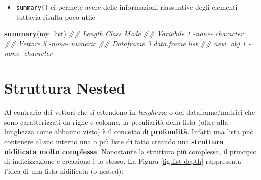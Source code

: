 \documentclass[
]{book}
\newenvironment{Shaded}{\begin{snugshade}}{\end{snugshade}}
\newcommand{\CommentTok}[1]{\textcolor[rgb]{0.56,0.35,0.01}{\textit{#1}}}
\newcommand{\KeywordTok}[1]{\textcolor[rgb]{0.13,0.29,0.53}{\textbf{#1}}}
\newcommand{\NormalTok}[1]{#1}
\providecommand{\tightlist}{%
  \setlength{\itemsep}{0pt}\setlength{\parskip}{0pt}}
\begin{document}
\begin{Shaded}
\end{Shaded}

\begin{itemize}
\tightlist
\item
  \texttt{summary()} ci permete avere delle informazioni riassuntive degli elementi tuttavia risulta poco utlie
\end{itemize}

\begin{Shaded}
\begin{Highlighting}[]
\KeywordTok{summary}\NormalTok{(my_list)}
\CommentTok{##           Length Class      Mode     }
\CommentTok{## Variabile 1      -none-     character}
\CommentTok{## Vettore   5      -none-     numeric  }
\CommentTok{## Dataframe 3      data.frame list     }
\CommentTok{## new_obj   1      -none-     character}
\end{Highlighting}
\end{Shaded}

\hypertarget{struttura-nested}{%
\section{Struttura Nested}\label{struttura-nested}}

Al contrario dei vettori che si estendono in \emph{lunghezza} o dei dataframe/matrici che sono caratterizzati da righe e colonne, la peculiarità della lista (oltre alla lunghezza come abbaimo visto) è il concetto di \textbf{profondità}. Infatti una lista può contenere al suo interno una o più liste di fatto creando una \textbf{struttura nidificata molto complessa}. Nonostante la struttura più complessa, il principio di indicizzazione e creazione è lo stesso. La Figura \ref{fig:list-depth} rappresenta l'idea di una lista nidificata (o nested):
\end{document}
